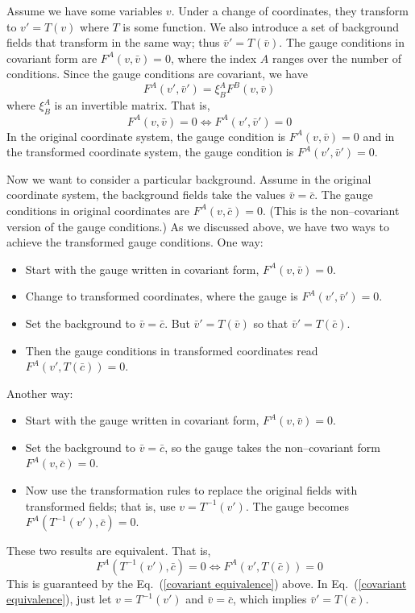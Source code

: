 Assume we have some variables $v$. Under a change of coordinates, they transform to $v' = T\left(v\right)$ where $T$ is some function. We also introduce a 
set of background fields that transform in the same way; thus $\bar v' = T\left(\bar v\right)$. The gauge conditions in covariant form are $F^A\left(v,\bar v\right) = 0$, 
where the index $A$ ranges over the number of conditions. Since the gauge conditions are covariant, we have 
\begin{equation}
	F^A\left(v',\bar v'\right) = \xi^A_B F^B\left(v,\bar v\right)
\end{equation}
where $\xi^A_B$ is an invertible matrix. That is, 
\begin{equation}\label{covariant equivalence}
	 F^A\left(v,\bar v\right) = 0 \Longleftrightarrow F^A\left(v',\bar v'\right) = 0
\end{equation}
In the original coordinate system, the gauge condition is $F^A\left(v,\bar v\right) = 0$ and in the transformed coordinate system, the 
gauge condition is $F^A\left(v',\bar v'\right) = 0$.

Now we want to consider a particular background. Assume in the original coordinate system, the background fields take the values $\bar v = \bar c$. The gauge 
conditions in original coordinates are $F^A\left(v,\bar c\right) = 0$. (This is the non--covariant version of the gauge conditions.) As we discussed above, we have two ways to achieve the transformed gauge conditions. One way: 
\begin{itemize}
	\item Start with the gauge written in covariant form, $F^A\left(v,\bar v\right) = 0$.
	\item Change to transformed coordinates, where the gauge is $F^A\left(v',\bar v'\right) = 0$.
	\item Set the background to $\bar v = \bar c$. But $\bar v' = T\left(\bar v\right)$ so that $\bar v' = T\left(\bar c\right)$. 
	\item Then the gauge conditions in transformed coordinates read $F^A\left(v',T\left(\bar c\right)\right) = 0$. 
\end{itemize}
Another way: 
\begin{itemize}
	\item Start with the gauge written in covariant form, $F^A\left(v,\bar v\right) = 0$.
	\item Set the background to $\bar v = \bar c$, so the gauge takes the non--covariant form $F^A\left(v,\bar c\right) = 0$. 
	\item Now use the transformation rules to replace the original fields with transformed fields; that is, use $v = T^{-1}\left(v'\right)$. 
	The gauge becomes $F^A\left(T^{-1}\left(v'\right),\bar c\right) = 0$. 
\end{itemize}
These two results are equivalent. That is, 
\begin{equation}
	F^A\left(T^{-1}\left(v'\right),\bar c\right) = 0 \Longleftrightarrow F^A\left(v',T\left(\bar c\right)\right) = 0
\end{equation}
This is guaranteed by the Eq.~(\ref{covariant equivalence}) above. In Eq.~(\ref{covariant equivalence}), just let $v = T^{-1}\left(v'\right)$ and $\bar v = \bar c$, which implies $\bar v' = T\left(\bar c\right)$.

